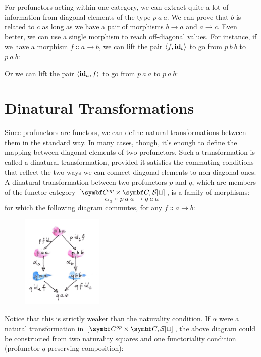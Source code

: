 For profunctors acting within one category, we can extract quite a lot
of information from diagonal elements of the type $p\ a\ a$. We
can prove that $b$ is related to $c$ as long as we have a
pair of morphisms $b \to a$ and
$a \to c$. Even better, we can use a single morphism to
reach off-diagonal values. For instance, if we have a morphism
$f \Colon a \to b$, we can lift the pair
$\langle f, \idarrow[b] \rangle$ to go from $p\ b\ b$ to
$p\ a\ b$:

Or we can lift the pair $\langle \idarrow[a], f \rangle$ to go
from $p\ a\ a$ to $p\ a\ b$:


\section{Dinatural Transformations}

Since profunctors are functors, we can define natural transformations
between them in the standard way. In many cases, though, it's enough to
define the mapping between diagonal elements of two profunctors. Such a
transformation is called a dinatural transformation, provided it
satisfies the commuting conditions that reflect the two ways we can
connect diagonal elements to non-diagonal ones. A dinatural
transformation between two profunctors $p$ and $q$, which
are members of the functor category ${[}\cat{C}^{op}\times{}\cat{C}, \Set{]}$, is a
family of morphisms:
\[\alpha_a \Colon p\ a\ a \to q\ a\ a\]
for which the following diagram commutes, for any $f \Colon a \to b$:

\begin{figure}[H]
\centering
\includegraphics[width=0.35\textwidth]{images/end.jpg}
\end{figure}

\noindent
Notice that this is strictly weaker than the naturality condition. If
$\alpha$ were a natural transformation in
${[}\cat{C}^{op}\times{}\cat{C}, \Set{]}$, the above diagram could be constructed
from two naturality squares and one functoriality condition (profunctor
$q$ preserving composition):

